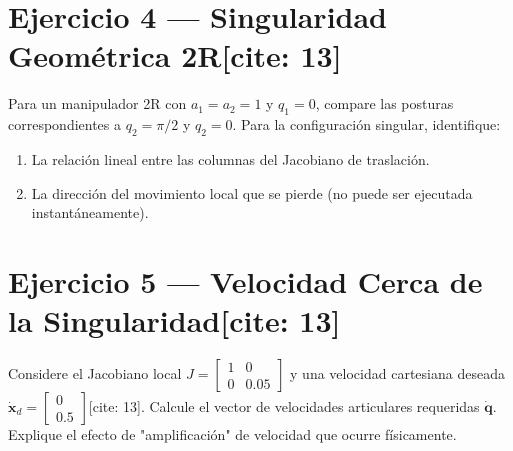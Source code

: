 \documentclass[11pt, a4paper]{article}
\begin{document}
\section*{Ejercicio 4 — Singularidad Geométrica 2R[cite: 13]}
Para un manipulador 2R con $a_1=a_2=1$ y $q_1=0$, compare las posturas correspondientes a $q_2 = \pi/2$ y $q_2 = 0$.
Para la configuración singular, identifique:
\begin{enumerate}
    \item La relación lineal entre las columnas del Jacobiano de traslación.
    \item La dirección del movimiento local que se pierde (no puede ser ejecutada instantáneamente).
\end{enumerate}
\vspace{3cm}

\section*{Ejercicio 5 — Velocidad Cerca de la Singularidad[cite: 13]}
Considere el Jacobiano local $J = \begin{bmatrix} 1 & 0 \\ 0 & 0.05 \end{bmatrix}$ y una velocidad cartesiana deseada $\dot{\mathbf{x}}_d = \begin{bmatrix} 0 \\ 0.5 \end{bmatrix}$[cite: 13].
Calcule el vector de velocidades articulares requeridas $\dot{\mathbf{q}}$. Explique el efecto de "amplificación" de velocidad que ocurre físicamente.
\vspace{3cm}
\end{document}
